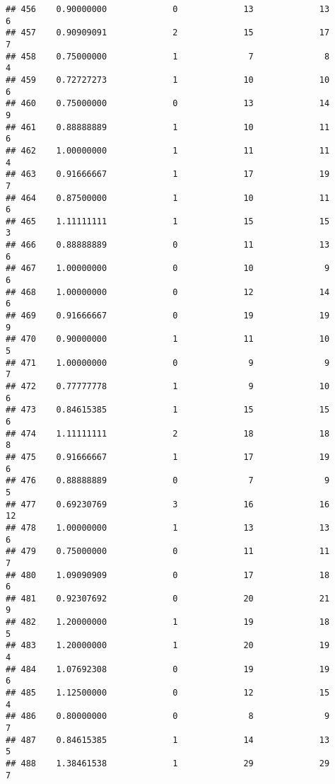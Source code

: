 \documentclass[
]{article}
\begin{document}
\begin{verbatim}
## 456    0.90000000             0             13             13              6
## 457    0.90909091             2             15             17              7
## 458    0.75000000             1              7              8              4
## 459    0.72727273             1             10             10              6
## 460    0.75000000             0             13             14              9
## 461    0.88888889             1             10             11              6
## 462    1.00000000             1             11             11              4
## 463    0.91666667             1             17             19              7
## 464    0.87500000             1             10             11              6
## 465    1.11111111             1             15             15              3
## 466    0.88888889             0             11             13              6
## 467    1.00000000             0             10              9              6
## 468    1.00000000             0             12             14              6
## 469    0.91666667             0             19             19              9
## 470    0.90000000             1             11             10              5
## 471    1.00000000             0              9              9              7
## 472    0.77777778             1              9             10              6
## 473    0.84615385             1             15             15              6
## 474    1.11111111             2             18             18              8
## 475    0.91666667             1             17             19              6
## 476    0.88888889             0              7              9              5
## 477    0.69230769             3             16             16             12
## 478    1.00000000             1             13             13              6
## 479    0.75000000             0             11             11              7
## 480    1.09090909             0             17             18              6
## 481    0.92307692             0             20             21              9
## 482    1.20000000             1             19             18              5
## 483    1.20000000             1             20             19              4
## 484    1.07692308             0             19             19              6
## 485    1.12500000             0             12             15              4
## 486    0.80000000             0              8              9              7
## 487    0.84615385             1             14             13              5
## 488    1.38461538             1             29             29              7

\end{verbatim}
\end{document}
